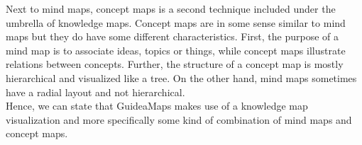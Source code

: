 Next to mind maps, concept maps is a second technique included under the umbrella of knowledge maps. Concept maps are in some sense similar to mind maps but they do have some different characteristics. First, the purpose of a mind map is to associate ideas, topics or things, while concept maps illustrate relations between concepts. Further, the structure of a concept map is mostly hierarchical and visualized like a tree. On the other hand, mind maps sometimes have a radial layout and not hierarchical. \citep{davies} \\

Hence, we can state that GuideaMaps makes use of a knowledge map visualization and more specifically some kind of combination of mind maps and concept maps.



